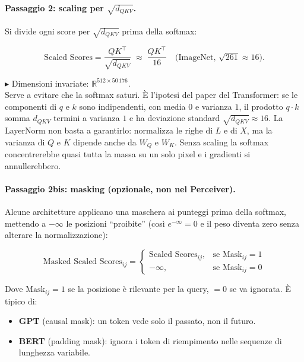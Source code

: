 \documentclass[
  11pt,
]{article}
\begin{document}
\paragraph{Passaggio 2: scaling per $\sqrt{d_{QKV}}$.} Si divide ogni score per $\sqrt{d_{QKV}}$ prima della softmax:

\begin{formulabox}[title={\textbf{Scaled Scores}}]
\[
\text{Scaled Scores} = \frac{QK^\top}{\sqrt{d_{QKV}}} \;\approx\; \frac{QK^\top}{16} \quad \text{(ImageNet, $\sqrt{261}\approx 16$)}.
\]
\end{formulabox}

$\blacktriangleright$ Dimensioni invariate: $\mathbb{R}^{512\times 50\,176}$. \\
Serve a evitare che la softmax saturi. È l'ipotesi del paper del Transformer: se le componenti di $q$ e $k$ sono indipendenti, con media $0$ e varianza $1$, il prodotto $q \cdot k$ somma $d_{QKV}$ termini a varianza $1$ e ha deviazione standard $\sqrt{d_{QKV}} \approx 16$. La LayerNorm non basta a garantirlo: normalizza le righe di $L$ e di $X$, ma la varianza di $Q$ e $K$ dipende anche da $W_Q$ e $W_K$. Senza scaling la softmax concentrerebbe quasi tutta la massa su un solo pixel e i gradienti si annullerebbero.

\paragraph{Passaggio 2bis: masking (opzionale, non nel Perceiver).} Alcune architetture applicano una maschera ai punteggi prima della softmax, mettendo a $-\infty$ le posizioni ``proibite'' (così $e^{-\infty}=0$ e il peso diventa zero senza alterare la normalizzazione):

\begin{formulabox}[title={\textbf{Masking}}]
\[
\text{Masked Scaled Scores}_{ij} = \begin{cases}
\text{Scaled Scores}_{ij}, & \text{se } \mathrm{Mask}_{ij} = 1 \\
-\infty, & \text{se } \mathrm{Mask}_{ij} = 0
\end{cases}
\]
\end{formulabox}

Dove $\mathrm{Mask}_{ij}=1$ se la posizione è rilevante per la query, $=0$ se va ignorata. È tipico di:

\begin{itemize}\setlength\itemsep{0.15em}
\item \textbf{GPT} (causal mask): un token vede solo il passato, non il futuro.
\item \textbf{BERT} (padding mask): ignora i token di riempimento nelle sequenze di lunghezza variabile.
\end{itemize}
\end{document}
